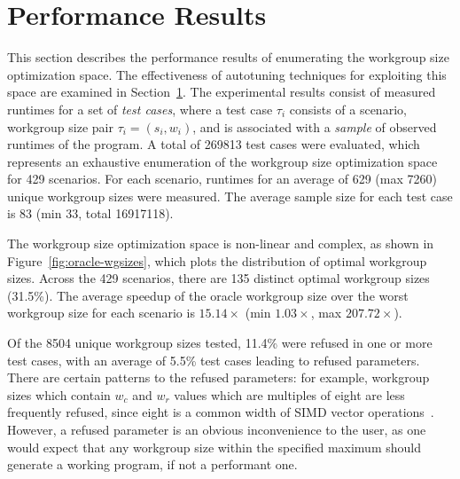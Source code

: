 \section{Performance Results}\label{sec:evaluation}

This section describes the performance results of enumerating the
workgroup size optimization space. The effectiveness of autotuning
techniques for exploiting this space are examined in
Section~\ref{sec:evaluation}. The experimental results consist of
measured runtimes for a set of \emph{test cases}, where a test case
$\tau_i$ consists of a scenario, workgroup size pair
$\tau_i = (s_i,w_i)$, and is associated with a \emph{sample} of
observed runtimes of the program. A total of 269813 test cases were
evaluated, which represents an exhaustive enumeration of the workgroup
size optimization space for 429 scenarios. For each scenario, runtimes
for an average of 629 (max 7260) unique workgroup sizes were
measured. The average sample size for each test case is 83 (min 33,
total 16917118).

The workgroup size optimization space is non-linear and complex, as
shown in Figure~\ref{fig:oracle-wgsizes}, which plots the distribution
of optimal workgroup sizes. Across the 429 scenarios, there are 135
distinct optimal workgroup sizes (31.5\%). The average speedup of the
oracle workgroup size over the worst workgroup size for each scenario
is $15.14\times$ (min $1.03\times$, max $207.72\times$).

Of the 8504 unique workgroup sizes tested, 11.4\% were refused in one
or more test cases, with an average of 5.5\% test cases leading to
refused parameters. There are certain patterns to the refused
parameters: for example, workgroup sizes which contain $w_c$ and $w_r$
values which are multiples of eight are less frequently refused, since
eight is a common width of SIMD vector
operations~\cite{IntelCorporation2012}. However, a refused parameter
is an obvious inconvenience to the user, as one would expect that any
workgroup size within the specified maximum should generate a working
program, if not a performant one.


